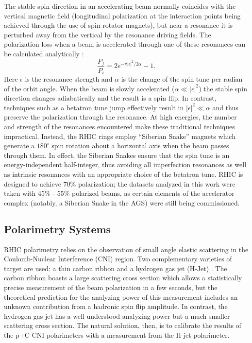 The stable spin direction in an accelerating beam normally coincides with the
vertical magnetic field (longitudinal polarization at the interaction points
being achieved through the use of spin rotator magnets), but near a resonance
it is perturbed away from the vertical by the resonance driving fields. The
polarization loss when a beam is accelerated through one of these resonances
can be calculated analytically \cite{Froissart:1960zz}:
%
\begin{equation}
  \frac{P_f}{P_i} = 2 e^{-\pi |\epsilon|^2 / 2\alpha} -1.
\end{equation}
%
Here $\epsilon$ is the resonance strength and $\alpha$ is the change of the
spin tune per radian of the orbit angle. When the beam is slowly accelerated
($\alpha \ll |\epsilon|^2$) the stable spin direction changes adiabatically
and the result is a spin flip. In contrast, techniques such as a betatron tune
jump effectively result in $|\epsilon|^2 \ll \alpha$ and thus preserve the
polarization through the resonance. At high energies, the number and strength
of the resonances encountered make these traditional techniques impractical.
Instead, the RHIC rings employ ``Siberian Snake'' magnets
\cite{Derbenev:1978hv} which generate a \(180^\circ\) spin rotation about a
horizontal axis when the beam passes through them. In effect, the Siberian
Snakes ensure that the spin tune is an energy-independent half-integer, thus
avoiding all imperfection resonances as well as intrinsic resonances with an
appropriate choice of the betatron tune. RHIC is designed to achieve 70\%
polarization; the datasets analyzed in this work were taken with 45\% - 55\%
polarized beams, as certain elements of the accelerator complex (notably, a
Siberian Snake in the AGS) were still being commissioned.

\subsection{Polarimetry Systems\label{sec:polarimeters}}

RHIC polarimetry relies on the observation of small angle elastic scattering
in the Coulomb-Nuclear Interference (CNI) region. Two complementary varieties
of target are used: a thin carbon ribbon \cite{Jinnouchi:2004up} and a
hydrogen gas jet (H-Jet) \cite{Zelenski:2005mz, Okada:2006dd}. The carbon
ribbon boasts a large scattering cross section which allows a statistically
precise measurement of the beam polarization in a few seconds, but the
theoretical prediction for the analyzing power of this measurement includes an
unknown contribution from a hadronic spin flip amplitude. In contrast, the
hydrogen gas jet has a well-understood analyzing power but a much smaller
scattering cross section. The natural solution, then, is to calibrate the
results of the p+C CNI polarimeters with a measurement from the H-jet
polarimeter.

